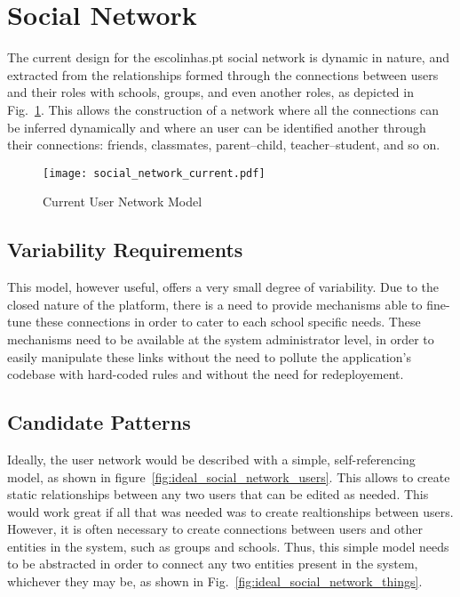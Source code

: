 \section{Social Network}\label{sec:fa_social_network}

The current design for the escolinhas.pt social network is dynamic in nature, and extracted from the relationships formed through the connections between users and their roles with schools, groups, and even another roles, as depicted in Fig.~\ref{fig:social_network_current}. This allows the construction of a network where all the connections can be inferred dynamically and where an user can be identified another through their connections: friends, classmates, parent--child, teacher--student, and so on.

\begin{figure}[H]
  \centering
  \texttt{[image: social\_network\_current.pdf]}
  \caption{Current User Network Model}
  \label{fig:social_network_current}
\end{figure}

\subsection{Variability Requirements}\label{sec:fa_social_network_variability_requirements}

This model, however useful, offers a very small degree of variability. Due to the closed nature of the platform, there is a need to provide mechanisms able to fine-tune these connections in order to cater to each school specific needs. These mechanisms need to be available at the system administrator level, in order to easily manipulate these links without the need to pollute the application's codebase with hard-coded rules and without the need for redeployement.

\subsection{Candidate Patterns}\label{sec:fa_social_network_candidate_patterns}

Ideally, the user network would be described with a simple, self-referencing model, as shown in figure~\ref{fig:ideal_social_network_users}. This allows to create static relationships between any two users that can be edited as needed. This would work great if all that was needed was to create realtionships between users. However, it is often necessary to create connections between users and other entities in the system, such as groups and schools. Thus, this simple model needs to be abstracted in order to connect any two entities present in the system, whichever they may be, as shown in Fig.~\ref{fig:ideal_social_network_things}.

